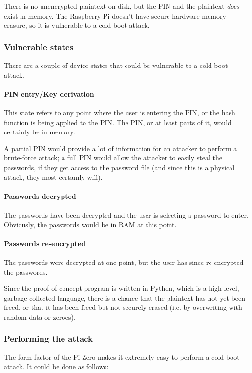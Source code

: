 \documentclass{article}
\begin{document}
There is no unencrypted plaintext on disk, but the PIN and the plaintext \textit{does} exist in memory. The Raspberry Pi doesn't have secure hardware memory erasure, so it is vulnerable to a cold boot attack.

\subsubsection{Vulnerable states}

There are a couple of device states that could be vulnerable to a cold-boot attack.

\paragraph{PIN entry/Key derivation} This state refers to any point where the user is entering the PIN, or the hash function is being applied to the PIN. The PIN, or at least parts of it, would certainly be in memory.

A partial PIN would provide a lot of information for an attacker to perform a brute-force attack; a full PIN would allow the attacker to easily steal the passwords, if they get access to the password file (and since this is a physical attack, they most certainly will).

\paragraph{Passwords decrypted} The passwords have been decrypted and the user is selecting a password to enter. Obviously, the passwords would be in RAM at this point.

\paragraph{Passwords re-encrypted} The passwords were decrypted at one point, but the user has since re-encrypted the passwords.

Since the proof of concept program is written in Python, which is a high-level, garbage collected language, there is a chance that the plaintext has not yet been freed, or that it has been freed but not securely erased (i.e. by overwriting with random data or zeroes). 

\subsubsection{Performing the attack}

The form factor of the Pi Zero makes it extremely easy to perform a cold boot attack. It could be done as follows:
\end{document}
